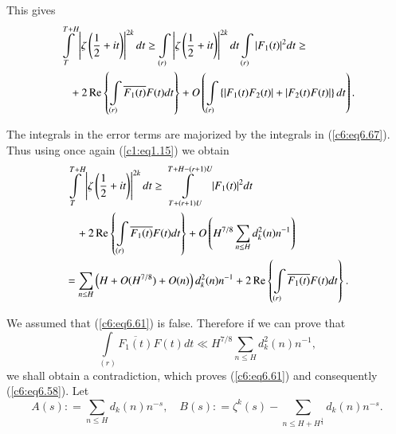 This gives
\begin{align}
&\int\limits^{T+H}_T \left|\zeta \left(\frac{1}{2} + it
  \right)\right|^{2k} dt \geq \int\limits_{(r)} \left|\zeta
  \left(\frac{1}{2} + it \right)\right|^{2k} 
  dt \int\limits_{(r)} |F_1(t)|^2 dt\geq
  \label{c6:eq6.69}\\ 
&\quad{} + 2 \operatorname{Re}  \left\{ \int\limits_{(r)} \overline{F_1(t)} F(t)
  dt\right\} +  O \left(\int\limits_{(r)} \left\{ |F_1(t) F_2(t)| +
  |F_2(t) F(t)|\right\} dt \right).\notag 
\end{align}

The integrals in the error terms are majorized by the integrals in
(\ref{c6:eq6.67}). Thus using once again (\ref{c1:eq1.15}) we obtain 
\begin{align}
& \int\limits^{T+H}_T \left|\zeta \left(\frac{1}{2} + it
  \right)\right|^{2k} dt \geq \int\limits^{T+H - (r+1) U}_{T + (r+1)
    U} |F_1(t)|^2 dt \label{c6:eq6.70}\\ 
&\quad +  2 \operatorname{Re} \left\{ \int\limits_{(r)} \overline{F_1(t)} F(t) dt
  \right\} + O \left(H^{7/8} \sum\limits_{n \leq H} d^2_k(n)
  n^{-1}\right)\notag\\ 
& = \sum\limits_{n \leq H} \left(H + O(H^{7/8}) + O (n)\right)
  d^2_k(n) n^{-1} + 2 \operatorname{Re} \left\{ \int\limits_{(r)} \overline{F_1(t)}
  F(t) dt\right\}.\notag 
\end{align}\pageoriginale

We assumed that (\ref{c6:eq6.61}) is false. Therefore if we can prove that 
\begin{equation}
\int\limits_{(r)} \overline{F_1(t)} F(t) dt \ll H^{7/8} \sum\limits_{n
  \leq H} d^2_k(n) n^{-1}, \label{c6:eq6.71} 
\end{equation}
we shall obtain a contradiction, which proves (\ref{c6:eq6.61}) and
consequently (\ref{c6:eq6.58}). Let 
$$ 
A(s) : = \sum\limits_{n \leq H} d_k(n) n^{-s},\quad B(s): = \zeta^{k}
(s) - \sum\limits_{n \leq H + H^{\frac{1}{4}}} d_k(n) n^{-s}.  
$$

